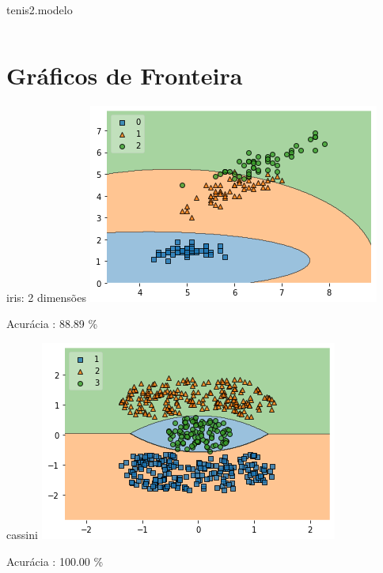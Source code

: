 \documentclass[darkblue]{beamer}
\begin{document}
    \begin{frame}[allowframebreaks]{tenis2.modelo}
    	\inputminted{python}{cod11.py}
    \end{frame}
    
    \section{Gráficos de Fronteira}
    
    \begin{frame}{iris: 2 dimensões}
        \includegraphics[width=\textwidth]{output_35_0.png}
        \centerline{Acurácia  : 88.89 \%}
    \end{frame}
    
    \begin{frame}{cassini}
        \includegraphics[width=\textwidth]{output_39_0.png}
        \centerline{Acurácia  : 100.00 \%}
    \end{frame}
    
\end{document}
